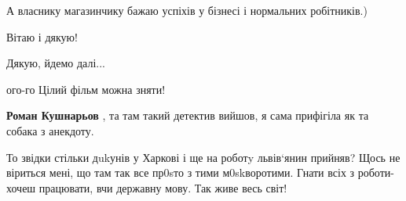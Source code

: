 \begin{itemize}
А власнику магазинчику бажаю успіхів у бізнесі і нормальних робітників.)

 
Вітаю і дякую!

 
Дякую, йдемо далі...

 
ого-го \Smiley[1.0][yellow] Цілий фільм можна зняти!

\begin{itemize}
 
\textbf{Роман Кушнарьов} , та там такий детектив вийшов, я сама прифігіла як та собака з анекдоту.
\end{itemize}

 

То звідки стільки дukунів у Харкові і ще на роботy львів‘янин прийняв? Щось не
віриться мені, що там так все пр0sто з тими м0skворотими. Гнати всіх з
роботи-хочеш працювати, вчи державну мову. Так живе весь світ!

\begin{itemize}
 

\end{itemize}
\end{itemize}
